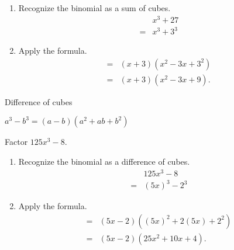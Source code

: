 \begin{multicols}{3}
		\begin{solution}\mbox{}
			\begin{enumerate}[label={\textbf{\textup{Step \arabic*.}}~}]
				\item Recognize the binomial as a sum of cubes.
				      \[
					      \begin{split}
						      &x^3+27\\
						      =&x^3+3^3
					      \end{split}
				      \]
				\item Apply the formula.
				      \[
					      \begin{split}
						      =&(x+3)(x^2-3x+3^2)\\
						      =&(x+3)(x^2-3x+9).
					      \end{split}
				      \]
			\end{enumerate}
		\end{solution}


		\columnbreak

		Difference of cubes\\
		\centerline{$a^3-b^3=(a-b)(a^2+ab+b^2)$}
		
		\begin{example}
			Factor $125x^3-8$.
		\end{example}

		\begin{solution}\mbox{}
			\begin{enumerate}[label={\textbf{\textup{Step \arabic*.}}~}]
				\item Recognize the binomial as a difference of cubes.
				      \[
					      \begin{split}
						      & 125x^3-8 \\
						      =& (5x)^3-2^3
					      \end{split}
				      \]
				\item Apply the formula.
				      \[
					      \begin{split}
						      =&(5x-2)((5x)^2+2(5x)+2^2) \\
						      =&(5x-2)(25x^2+10x+4).
					      \end{split}
				      \]
			\end{enumerate}
		\end{solution}

	\end{multicols}


